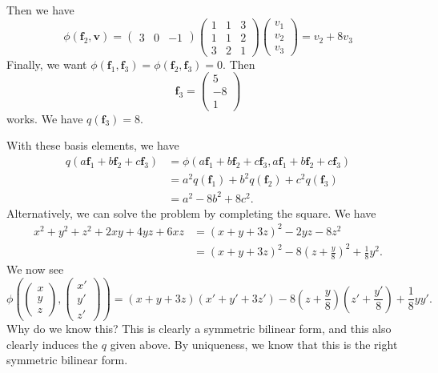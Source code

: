 \documentclass[a4paper]{article}
\begin{document}
\begin{eg}
  Then we have
  \[
    \phi(\mathbf{f}_2, \mathbf{v}) =
    \begin{pmatrix}
      3 & 0 & -1
    \end{pmatrix}
    \begin{pmatrix}
      1 & 1 & 3\\
      1 & 1 & 2\\
      3 & 2 & 1
    \end{pmatrix}
    \begin{pmatrix}
      v_1\\v_2\\v_3
    \end{pmatrix} = v_2 + 8v_3
  \]
  Finally, we want $\phi(\mathbf{f}_1, \mathbf{f}_3) = \phi(\mathbf{f}_2, \mathbf{f}_3) = 0$. Then
  \[
    \mathbf{f}_3 =
    \begin{pmatrix}
      5 \\ -8 \\1
    \end{pmatrix}
  \]
  works. We have $q(\mathbf{f}_3) = 8$.

  With these basis elements, we have
  \begin{align*}
    q(a \mathbf{f}_1 + b\mathbf{f}_2 + c \mathbf{f}_3) &= \phi(a \mathbf{f}_1 + b \mathbf{f}_2 + c \mathbf{f}_3, a \mathbf{f}_1 + b \mathbf{f}_2 + c \mathbf{f}_3) \\
    &= a^2 q (\mathbf{f}_1) + b^2 q(\mathbf{f}_2) + c^2 q(\mathbf{f}_3) \\
    &= a^2 - 8b^2 + 8c^2.
  \end{align*}
  Alternatively, we can solve the problem by completing the square. We have
  \begin{align*}
    x^2 + y^2 + z^2 + 2xy + 4yz + 6xz &= (x + y + 3z)^2 - 2yz - 8z^2\\
    &= (x + y + 3z)^2 - 8\left(z + \frac{y}{8}\right)^2 + \frac{1}{8}y^2.
  \end{align*}
  We now see
  \[
    \phi\left(
    \begin{pmatrix}
      x\\y\\z
    \end{pmatrix},
    \begin{pmatrix}
      x'\\y'\\z'
    \end{pmatrix}\right) = (x + y + 3z)(x' + y' + 3z') - 8\left(z + \frac{y}{8}\right)\left(z' + \frac{y'}{8}\right) + \frac{1}{8}yy'.
  \]
  Why do we know this? This is clearly a symmetric bilinear form, and this also clearly induces the $q$ given above. By uniqueness, we know that this is the right symmetric bilinear form.


\end{eg}
\end{document}

